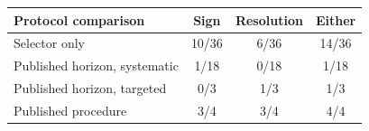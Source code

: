 
\scriptsize
\setlength{\tabcolsep}{4.5pt}
\renewcommand{\arraystretch}{1.1}

\begin{tabular}{@{}lccc@{}}
\toprule
Protocol comparison &
Sign &
Resolution &
Either \\
\midrule

Selector only
& 10/36 & 6/36 & 14/36 \\

Published horizon, systematic
& 1/18 & 0/18 & 1/18 \\

Published horizon, targeted
& 0/3 & 1/3 & 1/3 \\

Published procedure
& 3/4 & 3/4 & 4/4 \\

\bottomrule
\end{tabular}
